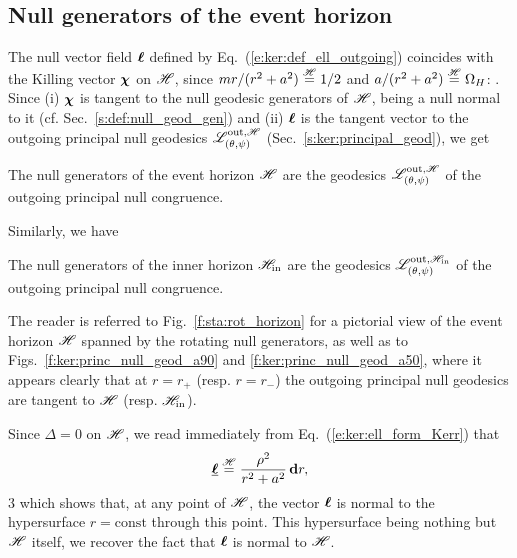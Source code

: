 \subsection{Null generators of the event horizon} \label{s:gek:null_gen_hor}

The null vector field $\bm{\ell}$ defined by Eq.~(\ref{e:ker:def_ell_outgoing}) coincides with the Killing vector $\bm{\chi}$ on $\mathscr{H}$,
since $m r/(r^2 + a^2) \stackrel{\mathscr{H}}{=} 1/2$ and $a/(r^2+a^2) \stackrel{\mathscr{H}}{=} \Omega_H$:
\be \label{e:ker:l_eqH_chi}
    \wl \equalH \w{\chi} .
\ee
Since (i) $\bm{\chi}$ is tangent
to the null geodesic generators of $\mathscr{H}$, being a null normal to it (cf. Sec.~\ref{s:def:null_geod_gen}) and (ii) $\bm{\ell}$ is the tangent vector to the
outgoing principal null geodesics $\mathscr{L}^{{\rm out},\mathscr{H}}_{(\theta,\psi)}$ (Sec.~\ref{s:ker:principal_geod}),
we get
\begin{prop}
The null generators of the event horizon $\mathscr{H}$ are the
geodesics $\mathscr{L}^{{\rm out},\mathscr{H}}_{(\theta,\psi)}$
of the outgoing principal null congruence.
\end{prop}

Similarly, we have
\begin{prop}
The null generators of the inner horizon $\mathscr{H}_{\rm in}$ are the
geodesics $\mathscr{L}^{{\rm out},\mathscr{H}_{\rm in}}_{(\theta,\psi)}$
of the outgoing principal null congruence.
\end{prop}

The reader is referred to Fig.~\ref{f:sta:rot_horizon} for a pictorial
view of the event horizon $\mathscr{H}$ spanned by the rotating null generators,
as well as to Figs.~\ref{f:ker:princ_null_geod_a90} and \ref{f:ker:princ_null_geod_a50},
where it appears clearly that at $r=r_+$ (resp. $r=r_-$) the outgoing principal null geodesics are
tangent to $\mathscr{H}$ (resp. $\mathscr{H}_{\rm in}$).

\begin{remark}
Since $\Delta=0$ on $\mathscr{H}$, we read immediately from Eq.~(\ref{e:ker:ell_form_Kerr})
that
\[
    \underline{\bm{\ell}} \stackrel{\mathscr{H}}{=} \frac{\rho^2}{r^2 + a^2} \, \mathbf{d} r ,
\]3
which shows that, at any point of $\mathscr{H}$, the vector $\bm{\ell}$ is normal to
the hypersurface $r = \mathrm{const}$ through this point. This hypersurface
being nothing but $\mathscr{H}$ itself, we recover the fact that $\bm{\ell}$ is normal
to $\mathscr{H}$.
\end{remark}

